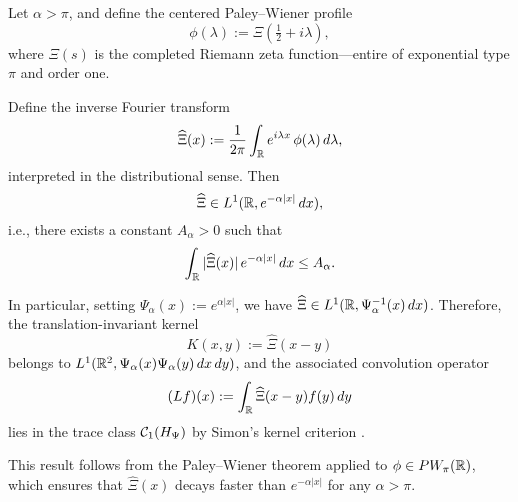 \begin{lemma}
\label{lem:ft_xi_weighted_L1}
Let \( \alpha > \pi \), and define the centered Paley--Wiener profile
\[
\phi(\lambda) := \Xi\left( \tfrac{1}{2} + i\lambda \right),
\]
where \( \Xi(s) \) is the completed Riemann zeta function—entire of exponential type \( \pi \) and order one.

Define the inverse Fourier transform
\[
\widehat{\Xi}(x) := \frac{1}{2\pi} \int_{\mathbb{R}} e^{i\lambda x} \, \phi(\lambda)\, d\lambda,
\]
interpreted in the distributional sense. Then
\[
\widehat{\Xi} \in L^1(\mathbb{R}, e^{-\alpha |x|}\, dx),
\]
i.e., there exists a constant \( A_\alpha > 0 \) such that
\[
\int_{\mathbb{R}} |\widehat{\Xi}(x)| \, e^{-\alpha |x|}\, dx \le A_\alpha.
\]

In particular, setting \( \Psi_\alpha(x) := e^{\alpha |x|} \), we have \( \widehat{\Xi} \in L^1(\mathbb{R}, \Psi_\alpha^{-1}(x)\, dx) \). Therefore, the translation-invariant kernel
\[
K(x,y) := \widehat{\Xi}(x - y)
\]
belongs to \( L^1(\mathbb{R}^2, \Psi_\alpha(x)\Psi_\alpha(y)\, dx\,dy) \), and the associated convolution operator
\[
(L f)(x) := \int_{\mathbb{R}} \widehat{\Xi}(x - y) f(y)\, dy
\]
lies in the trace class \( \mathcal{C}_1(H_{\Psi}) \) by Simon’s kernel criterion \cite[Thm.~4.2]{Simon2005TraceIdeals}.

\medskip
\noindent
This result follows from the Paley--Wiener theorem applied to \( \phi \in PW_\pi(\mathbb{R}) \), which ensures that \( \widehat{\Xi}(x) \) decays faster than \( e^{-\alpha |x|} \) for any \( \alpha > \pi \).
\end{lemma}
